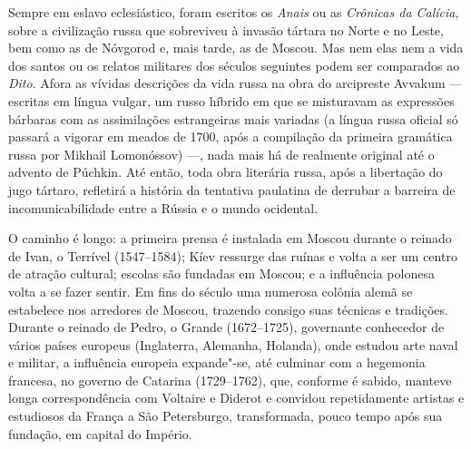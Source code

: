 Sempre em eslavo eclesiástico, foram escritos os \emph{Anais} ou as \emph{Crônicas da
Calícia}, sobre a civilização russa que sobreviveu à invasão tártara no Norte e
no Leste, bem como as de Nóvgorod e, mais tarde, as de Moscou. Mas nem
elas nem a vida dos santos ou os relatos militares dos séculos seguintes
podem ser comparados ao \emph{Dito}. Afora as vívidas descrições da vida russa
na obra do arcipreste Avvakum --- escritas em língua vulgar, um russo
híbrido em que se misturavam as expres­sões bárbaras com as assimilações
estrangeiras mais variadas (a língua russa oficial só passará a vigorar
em meados de 1700, após a compilação da primeira gramática russa por Mikhail Lomonóssov) ---, nada
mais há de realmente original até o advento de Púchkin. Até então, toda
obra literária russa, após a libertação do jugo tártaro, refletirá a
história da tentativa paulatina de derrubar a barreira de
incomunicabilidade entre a Rússia e o mundo ocidental.

O caminho é longo: a primeira prensa é instalada em Moscou durante o
rei­nado de Ivan, o Terrível (1547--1584); Kíev ressurge das ruínas e
volta a ser um centro de atração cultural; escolas são fundadas em
Moscou; e a influência po­lonesa volta a se fazer sentir. Em fins do
século  uma numerosa colônia alemã se estabelece nos arredores de
Moscou, trazendo consigo suas técnicas e tradições. Durante o reinado de
Pedro, o Grande (1672--1725), governante co­nhecedor de vários países
europeus (Inglaterra, Alemanha, Holanda), onde es­tudou arte naval e
militar, a influência europeia expande"-se, até culminar com a hegemonia
francesa, no governo de Catarina  (1729--1762), que, conforme é sabido,
manteve longa correspondência com Voltaire e Diderot e convidou
re­petidamente artistas e estudiosos da França a São Petersburgo, transformada, pouco tempo após sua fundação, em
capital do Império.

